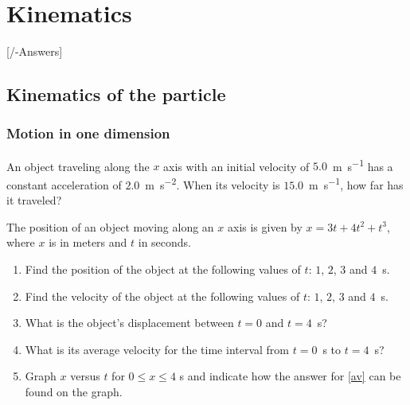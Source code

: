 
\chapter{Kinematics}\label{\currfilebase}
[\currfilebase/\currfilebase-Answers]
%

\section{Kinematics of the particle}

\subsection{Motion in one dimension}


\begin{problem}
	An object traveling along the $x$ axis with an initial velocity
	of $5.0$~\si{\meter\per\second} has a constant acceleration of $2.0$~\si{\meter\per\square\second}. When its velocity is $15.0$~\si{\meter\per\second}, how far has it traveled?
\end{problem}


\begin{problem}
	The position of an object moving along an $x$ axis is given
	by $x = 3t  + 4t^2  + t^3$, where $x$ is in meters and $t$ in seconds. 
	\begin{enumerate}[label = (\alph*)]
		\item Find the position of the object at the following values of $t$: $1$, $2$, $3$ and $4$~s.
		\item Find the velocity of the object at the following values of $t$: $1$, $2$, $3$ and $4$~s.
		\item What is the object's displacement between $t = 0$
		and $t = 4$~s?
		\item \label{av} What is its average velocity for the time interval
		from  $t = 0$~s to  $t = 4$~s?
		\item Graph $x$ versus $t$ for $0 \le x \le 4$ s and indicate how the answer for \ref{av} can be found on the graph.
	\end{enumerate} 
\end{problem}


